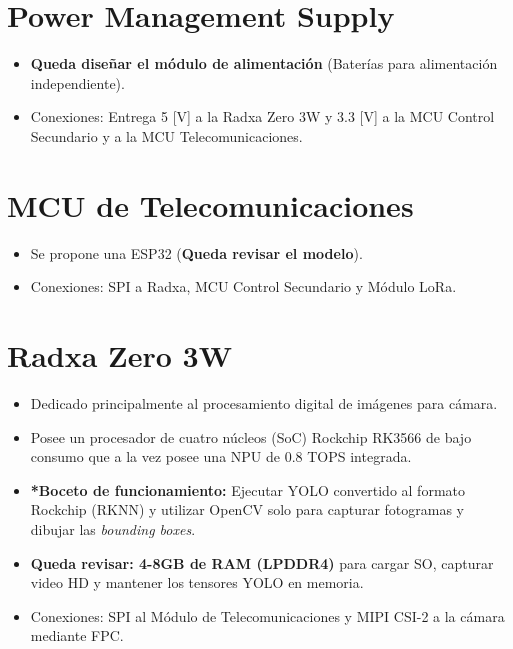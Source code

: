 \documentclass[letterpaper,11pt]{article}
\begin{document}
\begin{center}
\end{center}

\newpage

\section{Power Management Supply} \hypertarget{sec:pms}{}
\begin{itemize}
    \item \textbf{Queda diseñar el módulo de alimentación} (Baterías para alimentación independiente).
    \item Conexiones: Entrega 5 [V] a la Radxa Zero 3W y 3.3 [V] a la MCU Control Secundario y a la MCU Telecomunicaciones.
\end{itemize}

\section{MCU de Telecomunicaciones} \hypertarget{sec:telco}{}
\begin{itemize}
    \item Se propone una ESP32 (\textbf{Queda revisar el modelo}).
    \item Conexiones: SPI a Radxa, MCU Control Secundario y Módulo LoRa.
\end{itemize}

\section{Radxa Zero 3W} \hypertarget{sec:radxa}{}
\begin{itemize}
    \item Dedicado principalmente al procesamiento digital de imágenes para cámara.
    \item Posee un procesador de cuatro núcleos (SoC) Rockchip RK3566 de bajo consumo que a la vez posee una NPU de 0.8 TOPS integrada.
    \item \textbf{*Boceto de funcionamiento:} Ejecutar YOLO convertido al formato Rockchip (RKNN) y utilizar OpenCV solo para capturar fotogramas y dibujar las \textit{bounding boxes}.
    \item \textbf{Queda revisar: 4-8GB de RAM (LPDDR4)} para cargar SO, capturar video HD y mantener los tensores YOLO en memoria.
    \item Conexiones: SPI al Módulo de Telecomunicaciones y MIPI CSI-2 a la cámara mediante FPC.
\end{itemize}
\end{document}
